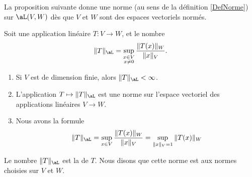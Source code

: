 La proposition suivante donne une norme (au sens de la définition \ref{DefNorme}) sur $\aL(V,W)$ dès que \( V\) et \( W\) sont des espaces vectoriels normés.
\begin{propositionDef}          \label{DefNFYUooBZCPTr}
    Soit une application linéaire \( T\colon V\to W\), et le nombre
	\begin{equation}
        \|T\|_{\aL}=\sup_{\substack{x\in V\\x\neq 0}}\frac{\|T(x)\|_{W}}{\|x\|_{V}}.
	\end{equation}
    \begin{enumerate}
        \item
            Si \( V\) est de dimension finie, alors \( \| T \|_{\aL}<\infty\).
        \item
            L'application \( T\mapsto\| T \|_{\aL}\) est une norme sur l'espace vectoriel des applications linéaires \( V\to W\).
        \item       \label{ITEMooUQPRooYQGZzu}
            Nous avons la formule
            \begin{equation}    \label{EqFZPooIoecGH}
                \| T \|_{\aL}=\sup_{x\in V}\frac{\|T(x)\|_{W}}{\|x\|_{V}} =\sup_{\|x\|_{V}=1}\|T(x)\|_{W}
            \end{equation}
    \end{enumerate}
    Le nombre \( \| T \|_{\aL}\) est la  de $T$. Nous disons que cette norme est  aux normes choisies sur \( V\) et \( W\). 
\end{propositionDef}

